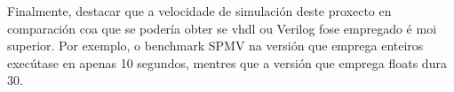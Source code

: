 Finalmente, destacar que a velocidade de simulación deste proxecto en comparación coa que se podería obter se \acrshort{vhdl} ou Verilog fose empregado é moi superior. Por exemplo, o benchmark SPMV na versión que emprega enteiros execútase en apenas 10 segundos, mentres que a versión que emprega floats dura 30.

